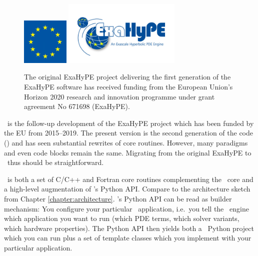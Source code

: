 \chapter{\ExaHyPE}
\label{section:exahype}


\begin{figure}[htb]
 \begin{center}
  \includegraphics[width=0.2\textwidth]{60_exahype/EU.png}
  \includegraphics[width=0.5\textwidth]{60_exahype/ExaHyPE_Logo.jpg}
 \end{center}
 \caption{
   The original ExaHyPE project delivering the first generation of the ExaHyPE
   software has received funding from the European Union’s Horizon 2020 research
   and innovation programme under grant agreement No 671698 (ExaHyPE).
 }
\end{figure}

\noindent
\ExaHyPE\ is the follow-up development of the ExaHyPE project which has been
funded by the EU from 2015--2019.
The present version is the second generation of the code (\ExaHyPE) and has
seen substantial rewrites of core routines.
However, many paradigms and even code blocks remain the same.
Migrating from the original ExaHyPE to \ExaHyPE\ thus should be straightforward.


\ExaHyPE\ is both a set of C/C++ and Fortran core routines complementing the
\Peano\ core and a high-level augmentation of \Peano's Python API.
Compare to the architecture sketch from Chapter \ref{chapter:architecture}.
\ExaHyPE's Python API can be read as builder mechanism:
You configure your particular \ExaHyPE\ application, i.e.~you tell the \ExaHyPE\
engine which application you want to run (which PDE terms, which solver
variants, which hardware properties).
The Python API then yields both a \Peano\ Python project which you can run plus
a set of template classes which you implement with your particular application.


